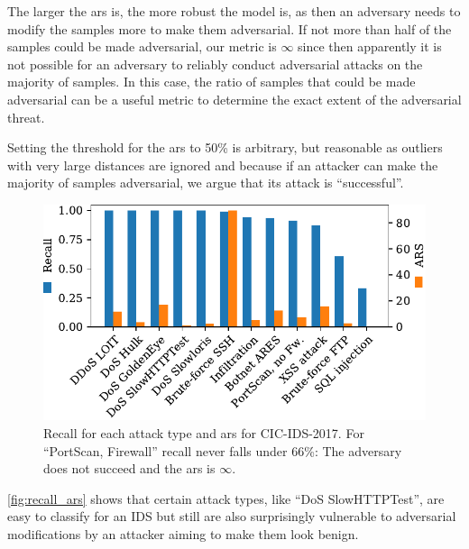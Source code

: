 \documentclass[conference]{IEEEtran}
\begin{document}
The larger the \gls{ars} is, the more robust the model is, as then an adversary needs to modify the samples more to make them adversarial. If not more than half of the samples could be made adversarial, our metric is $\infty$ since then apparently it is not possible for an adversary to reliably conduct adversarial attacks on the majority of samples. In this case, the ratio of samples that could be made adversarial can be a useful metric to determine the exact extent of the adversarial threat.

Setting the threshold for the \gls{ars} to 50\% is arbitrary, but
 reasonable as outliers with very large distances are ignored and because if an attacker can make the majority of samples adversarial, we argue that its attack is ``successful''.

\begin{figure}[h]
\includegraphics[width=\columnwidth]{../plots/ars_original.pdf}
\caption{Recall for each attack type and \gls{ars} for CIC-IDS-2017. For ``PortScan, Firewall'' recall never falls under 66\%: The adversary does not succeed and the \gls{ars} is $\infty$.}
\label{fig:recall_ars}
\end{figure}

\autoref{fig:recall_ars} shows that certain attack types, like ``DoS SlowHTTPTest'', are easy to classify for an IDS but still are also surprisingly vulnerable to adversarial modifications by an attacker aiming to make them look benign.
\end{document}
